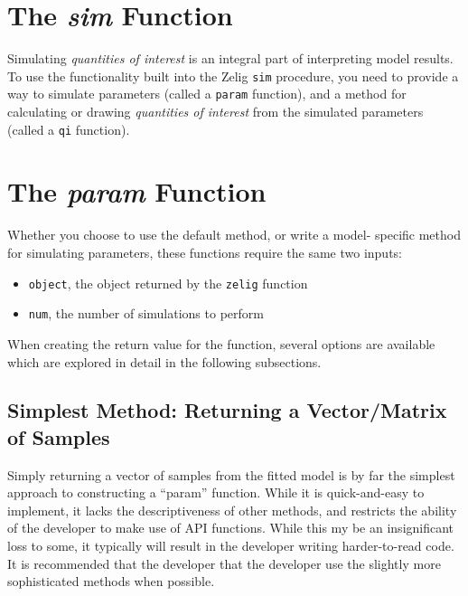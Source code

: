 \documentclass[11pt]{article}
\begin{document}
%
\section{The \emph{sim} Function}

Simulating \emph{quantities of interest} is an integral part of interpreting model results. To use the functionality built into the Zelig {\tt sim} procedure, you need to provide a way to simulate parameters (called a {\tt param} function), and a method for calculating or drawing \emph{quantities of interest} from the simulated parameters (called a {\tt qi} function).


\section{The \emph{param} Function}
Whether you choose to use the default method, or write a model- specific method for simulating parameters, these functions require the same two inputs:

\begin{itemize}
	\item{{\tt object}, the object returned by the {\tt zelig} function}
	\item{{\tt num}, the number of simulations to perform}
\end{itemize}

When creating the return value for the function, several options are available which are explored in detail in the following subsections.

\subsection{Simplest Method: Returning a Vector/Matrix of Samples}

Simply returning a vector of samples from the fitted model is by far the simplest approach to constructing a ``param'' function.  While it is quick-and-easy to implement, it lacks the descriptiveness of other methods, and restricts the ability of the developer to make use of API functions.  While this my be an insignificant loss to some, it typically will result in the developer writing harder-to-read code.  It is recommended that the developer that the developer use the slightly more sophisticated methods when possible.
\end{document}
